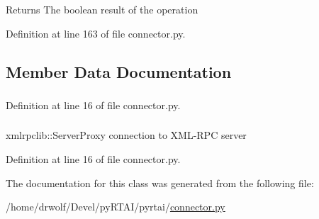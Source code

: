 \begin{DoxyReturn}{\-Returns}
\-The boolean result of the operation 
\end{DoxyReturn}


\-Definition at line 163 of file connector.\-py.



\subsection{\-Member \-Data \-Documentation}
\hypertarget{classpyrtai_1_1connector_1_1_connector_a44e0d21f1c12d1f649d9cd50d6146b52}{
\subsubsection[{config}]{}}
\label{classpyrtai_1_1connector_1_1_connector_a44e0d21f1c12d1f649d9cd50d6146b52}


\-Definition at line 16 of file connector.\-py.

\hypertarget{classpyrtai_1_1connector_1_1_connector_a8a24261df24fa194bffaa7f3bed268cb}{
\subsubsection[{connection}]{}}
\label{classpyrtai_1_1connector_1_1_connector_a8a24261df24fa194bffaa7f3bed268cb}


xmlrpclib\-::\-Server\-Proxy connection to \-X\-M\-L-\/\-R\-P\-C server 



\-Definition at line 16 of file connector.\-py.



\-The documentation for this class was generated from the following file\-:\begin{DoxyCompactItemize}
\item 
/home/drwolf/\-Devel/py\-R\-T\-A\-I/pyrtai/\hyperlink{connector_8py}{connector.\-py}\end{DoxyCompactItemize}
